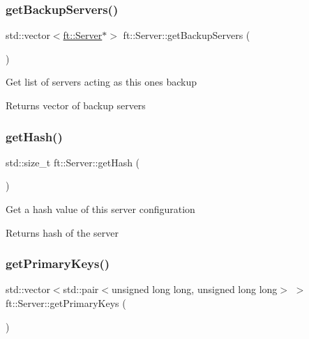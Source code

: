 \subsubsection{\texorpdfstring{get\+Backup\+Servers()}{getBackupServers()}}
{\footnotesize\ttfamily std\+::vector$<$\mbox{\hyperlink{classft_1_1Server}{ft\+::\+Server}}$\ast$$>$ ft\+::\+Server\+::get\+Backup\+Servers (\begin{DoxyParamCaption}{ }\end{DoxyParamCaption})\hspace{0.3cm}{\ttfamily [inline]}}

Get list of servers acting as this one\textquotesingle{}s backup

\begin{DoxyReturn}{Returns}
vector of backup servers 
\end{DoxyReturn}
\mbox{\label{classft_1_1Server_aef123896c2f84d6bc2c5fe2940d1a8b4}} 
\subsubsection{\texorpdfstring{get\+Hash()}{getHash()}}
{\footnotesize\ttfamily std\+::size\+\_\+t ft\+::\+Server\+::get\+Hash (\begin{DoxyParamCaption}{ }\end{DoxyParamCaption})}

Get a hash value of this server configuration

\begin{DoxyReturn}{Returns}
hash of the server 
\end{DoxyReturn}
\mbox{\label{classft_1_1Server_a86cc643b14f616c8ba0ecaddbbb696eb}} 
\subsubsection{\texorpdfstring{get\+Primary\+Keys()}{getPrimaryKeys()}}
{\footnotesize\ttfamily std\+::vector$<$std\+::pair$<$unsigned long long, unsigned long long$>$ $>$ ft\+::\+Server\+::get\+Primary\+Keys (\begin{DoxyParamCaption}{ }\end{DoxyParamCaption})\hspace{0.3cm}{\ttfamily [inline]}}

